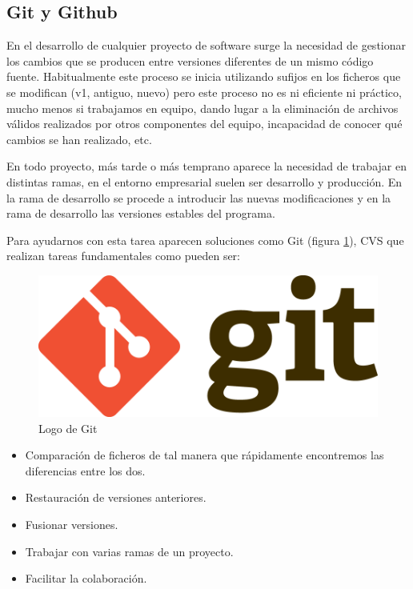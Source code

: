 \subsection{Git y Github}

En el desarrollo de cualquier proyecto de software surge la necesidad de gestionar los cambios que se producen entre versiones diferentes de un mismo código fuente. Habitualmente este proceso se inicia utilizando sufijos en los ficheros que se modifican (v1, antiguo, nuevo) pero este proceso no es ni eficiente ni práctico, mucho menos si trabajamos en equipo, dando lugar a la eliminación de archivos válidos realizados por otros componentes del equipo, incapacidad de conocer qué cambios se han realizado, etc.

En todo proyecto, más tarde o más temprano aparece la necesidad de trabajar en distintas ramas, en el entorno empresarial suelen ser desarrollo y producción. En la rama de desarrollo se procede a introducir las nuevas modificaciones y en la rama de desarrollo las versiones estables del programa.

Para ayudarnos con esta tarea aparecen soluciones como Git (figura \ref{fig:git}), CVS que realizan tareas fundamentales como pueden ser:

\begin{figure}[H]
    \centering
    \includegraphics[scale=0.1]{include/figuras/Git.png}
    \caption{Logo de Git}
    \label{fig:git}
\end{figure}

\begin{itemize}
    \item Comparación de ficheros de tal manera que rápidamente encontremos las diferencias entre los dos. 
    \item Restauración de versiones anteriores.
    \item Fusionar versiones.
    \item Trabajar con varias ramas de un proyecto.
    \item Facilitar la colaboración.
\end{itemize}


